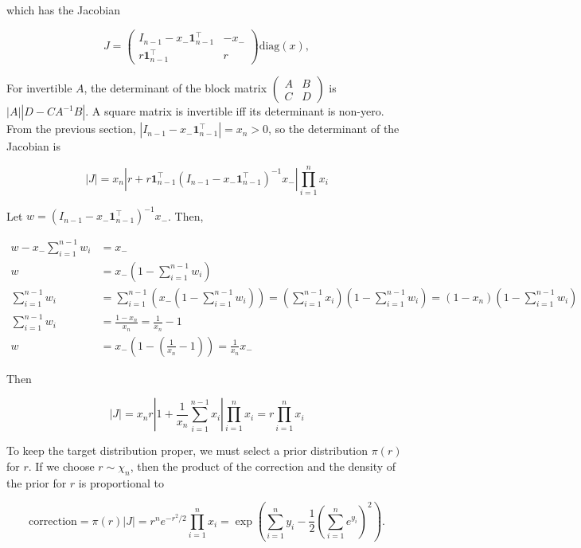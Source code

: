 \documentclass[twoside]{article}
\begin{document}
which has the Jacobian

$$J = \begin{pmatrix}I_{n-1} - x_- \boldsymbol{1}_{n-1}^\top & -x_- \\ r \boldsymbol{1}_{n-1}^\top & r \end{pmatrix} \mathrm{diag}(x),$$

For invertible $A$, the determinant of the block matrix $\begin{pmatrix}A & B \\ C & D\end{pmatrix}$ is $|A| |D-CA^{-1}B|$.
A square matrix is invertible iff its determinant is non-yero.
From the previous section, $|I_{n-1} - x_- \boldsymbol{1}_{n-1}^\top| = x_n > 0$, so the determinant of the Jacobian is

$$|J| = x_n \left|r + r \boldsymbol{1}_{n-1}^\top (I_{n-1} - x_- \boldsymbol{1}_{n-1}^\top)^{-1} x_-\right| \prod_{i=1}^n x_i$$

Let $w = (I_{n-1} - x_- \boldsymbol{1}_{n-1}^\top)^{-1} x_-$. Then,

$$
\begin{aligned}
    w - x_- \sum_{i=1}^{n-1} w_i &= x_-\\
    w &= x_- \left(1 - \sum_{i=1}^{n-1} w_i\right)\\
    \sum_{i=1}^{n-1} w_i &= \sum_{i=1}^{n-1} \left( x_- (1 - \sum_{i=1}^{n-1} w_i) \right) = \left(\sum_{i=1}^{n-1} x_i \right) \left(1 - \sum_{i=1}^{n-1} w_i\right) = (1 - x_n)  \left(1 - \sum_{i=1}^{n-1} w_i\right)\\
    \sum_{i=1}^{n-1} w_i &= \frac{1 - x_n}{x_n} = \frac{1}{x_n} - 1\\
    w &= x_- \left(1 - \left(\frac{1}{x_n} - 1\right)\right) = \frac{1}{x_n} x_-
\end{aligned}
$$

Then

$$|J| = x_n r \left|1 + \frac{1}{x_n}\sum_{i=1}^{n-1} x_i\right| \prod_{i=1}^n x_i = r \prod_{i=1}^n x_i$$

To keep the target distribution proper, we must select a prior distribution $\pi(r)$ for $r$.
If we choose $r \sim \chi_n$, then the product of the correction and the density of the prior for $r$ is proportional to

$$\mathrm{correction} = \pi(r) |J| = r^n e^{-r^2/2} \prod_{i=1}^n x_i = \exp\left(\sum_{i=1}^n y_i - \frac{1}{2}\left(\sum_{i=1}^n e^{y_i}\right)^2\right).$$

\vfill
\end{document}
